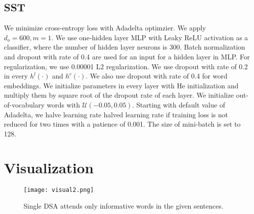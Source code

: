 \documentclass[11pt,a4paper]{article}
\begin{document}
\subsection{SST}
We minimize cross-entropy loss with Adadelta optimzier. We apply $d_o=600, m=1$. We use one-hidden layer MLP with Leaky ReLU activation as a classifier, where the number of hidden layer neurons is 300. Batch normalization and dropout with rate of 0.4 are used for an input for a hidden layer in MLP. For regularization, we use 0.00001 L2 regularization. We use dropout with rate of 0.2 in every $h^{l}(\cdot)$ and $h^{c}(\cdot)$. We also use dropout with rate of 0.4 for word embeddings. We initialize parameters in every layer with He initialization and multiply them by square root of the dropout rate of each layer. We initialize out-of-vocabulary words with $\mathcal{U}(-0.05, 0.05)$. Starting with default value of Adadelta, we halve learning rate halved learning rate if training loss is not reduced for two times with a patience of 0.001. The size of mini-batch is set to 128.




\section*{Visualization}


\begin{figure}[H]
        \texttt{[image: visual2.png]}
        \caption{Single DSA attends only informative words in the given sentences.}
\end{figure}
\end{document}
